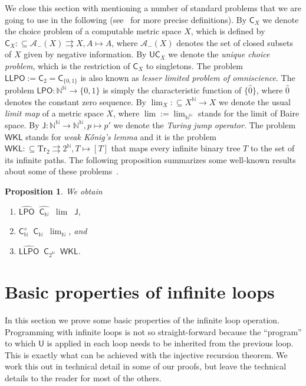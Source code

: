 \documentclass[11pt,a4paper]{amsart}
\theoremstyle{plain}
\newtheorem{prop}[thm]{Proposition}
\theoremstyle{definition}
\theoremstyle{defC}
\theoremstyle{thmC}
\theoremstyle{plain}
\numberwithin{equation}{section}
\def\AA{{\mathcal A}}
\def\IN{{\mathbb{N}}}
\def\In{\subseteq}
\def\mto{\rightrightarrows}
\def\J{{\mathsf{{J}}}}
\def\U{{\mathsf{{U}}}}
\def\C{{\mathsf{{C}}}}
\def\Tr{{\mathrm{Tr}}}
\def\LPO{\mathsf{LPO}}
\def\LLPO{\mathsf{LLPO}}
\def\WKL{\mathsf{WKL}}
\def\C{\mathsf{C}}
\def\equivSW{\mathop{\equiv_{\mathrm{sW}}}}
\def\equivSW{\mathop{\equiv_{\mathrm{sW}}}}
\begin{document}
\noindent
We close this section with mentioning a number of standard problems that we are going to use in the
following (see~\cite{BGP21} for more precise definitions). 
By $\C_X$ we denote the choice problem of a computable metric space $X$, which is defined
by $\C_X:\In\AA_-(X)\mto X,A\mapsto A$, where $\AA_-(X)$ denotes the set of closed subsets of $X$
given by negative information. 
By $\U\C_X$ we denote the {\em unique choice problem}, which is the restriction of $\C_X$ to singletons.
The problem $\LLPO:=\C_2=\C_{\{0,1\}}$ is also known as
{\em lesser limited problem of omniscience}. The problem $\LPO:\IN^\IN\to\{0,1\}$ is simply
the characteristic function of $\{\widehat{0}\}$, where $\widehat{0}$ denotes the constant zero sequence.
By $\lim_X:\In X^\IN\to X$ we denote the usual {\em limit map} of a metric space $X$, where $\lim:=\lim_{\IN^\IN}$
stands for the limit of Baire space. 
By $\J:\IN^\IN\to\IN^\IN,p\mapsto p'$ we denote the {\em Turing jump operator}.
The problem $\WKL$ stands for {\em weak K\H{o}nig's lemma} and it
is the problem $\WKL:\In\Tr_2\mto 2^\IN, T\mapsto [T]$ that maps every infinite binary tree $T$ to the set
of its infinite paths. The following proposition summarizes some well-known results about some of these problems~\cite{BG11,BBP12,BGP21}.

\begin{prop}
\label{prop:classical-problems}
We obtain 
\begin{enumerate}
\item $\widehat{\LPO}\equivSW\widehat{\C_\IN}\equivSW\lim\equivSW\J$, 
\item $\C_\IN^\diamond\equivSW\C_\IN\equivSW\lim_\IN$, and  
\item $\widehat{\LLPO}\equivSW\C_{2^\IN}\equivSW\WKL$.
\end{enumerate}
\end{prop}


\section{Basic properties of infinite loops}
\label{sec:basic}

In this section we prove some basic properties  of the infinite loop operation.
Programming with infinite loops is not so straight-forward because the ``program'' to which $\U$
is applied in each loop needs to be inherited from the previous loop.
This is exactly what can be achieved with the injective recursion theorem.
We work this out in technical detail in some of our proofs, but leave the technical details
to the reader for most of the others.
\end{document}
